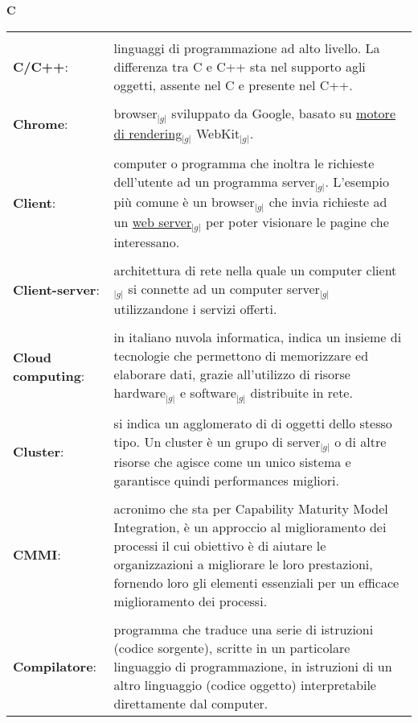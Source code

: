 \hfill\Huge{\textbf{C}}\\
\normalsize
	\begin{longtable}{p{} p{}} 
	    \toprule
	    \\
	    \textbf{C/C++}:			&	linguaggi di programmazione ad alto livello. La differenza tra C e C++ sta nel supporto agli oggetti, assente nel C e presente nel C++.\\
	    \\
	    \textbf{Chrome}:			&	browser$_{|g|}$ sviluppato da Google, basato su \underline{motore di rendering}$_{|g|}$ WebKit$_{|g|}$.\\
	    \\
	    \textbf{Client}:			&	computer o programma che inoltra le richieste dell’utente ad un programma server$_{|g|}$. L’esempio più comune è un browser$_{|g|}$ che invia richieste ad un \underline{web server}$_{|g|}$ per poter visionare le pagine che interessano.\\
	    \\
	    \textbf{Client-server}:		&	architettura di rete nella quale un computer client$_{|g|}$ si connette ad un computer server$_{|g|}$ utilizzandone i servizi offerti.\\
	    \\
	    \textbf{Cloud computing}: 		&	in italiano nuvola informatica, indica un insieme di tecnologie che permettono di memorizzare ed elaborare dati, grazie all’utilizzo di risorse hardware$_{|g|}$ e software$_{|g|}$ distribuite in rete.\\
	    \\
	    \textbf{Cluster}:			&	si indica un agglomerato di di oggetti dello stesso tipo. Un cluster è un grupo di server$_{|g|}$ o di altre risorse che agisce come un unico sistema e garantisce quindi performances migliori.\\
	    \\
	    \textbf{CMMI}:			&	acronimo che sta per Capability Maturity Model Integration, è un approccio al miglioramento dei processi il cui obiettivo è di aiutare le organizzazioni a migliorare 
							le loro prestazioni, fornendo loro gli elementi essenziali per un efficace miglioramento dei processi.\\
	    \\
	    \textbf{Compilatore}:		&	programma che traduce una serie di istruzioni (codice sorgente), scritte in un particolare linguaggio di programmazione, in istruzioni di un altro linguaggio (codice oggetto) interpretabile direttamente dal computer.\\

\end{longtable}
